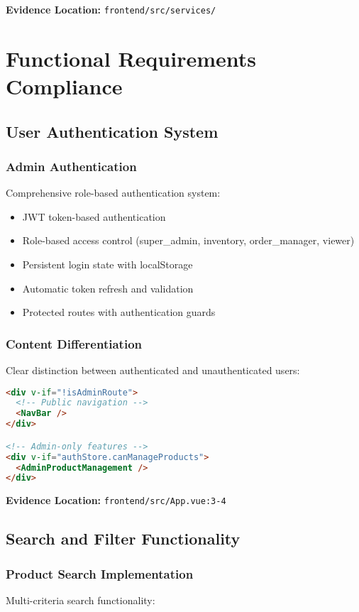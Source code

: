 \documentclass[12pt,a4paper]{article}
\begin{document}
\textbf{Evidence Location:} \texttt{frontend/src/services/}

\section{Functional Requirements Compliance}

\subsection{User Authentication System}

\subsubsection{Admin Authentication}
Comprehensive role-based authentication system:

\begin{itemize}
    \item JWT token-based authentication
    \item Role-based access control (super\_admin, inventory, order\_manager, viewer)
    \item Persistent login state with localStorage
    \item Automatic token refresh and validation
    \item Protected routes with authentication guards
\end{itemize}

\subsubsection{Content Differentiation}
Clear distinction between authenticated and unauthenticated users:

\begin{lstlisting}[language=html, caption=Conditional Content Rendering]
<div v-if="!isAdminRoute">
  <!-- Public navigation -->
  <NavBar />
</div>

<!-- Admin-only features -->
<div v-if="authStore.canManageProducts">
  <AdminProductManagement />
</div>
\end{lstlisting}

\textbf{Evidence Location:} \texttt{frontend/src/App.vue:3-4}

\subsection{Search and Filter Functionality}

\subsubsection{Product Search Implementation}
Multi-criteria search functionality:
\end{document}
